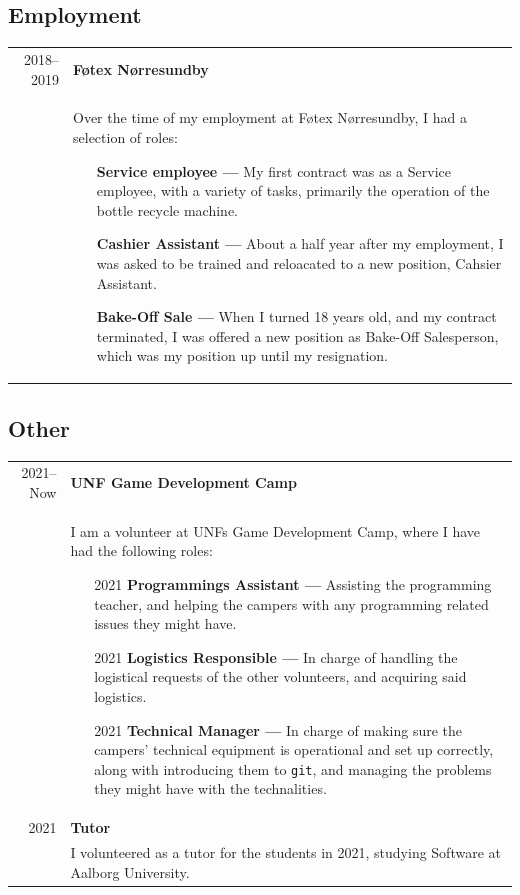 \documentclass{article}
\begin{document}
    \subsection*{Employment}
    \begin{tabular}{p{}|p{}}
    \multicolumn{1}{r|}{2018--2019} & \textbf{Føtex Nørresundby}\\
    &   Over the time of my employment at Føtex Nørresundby, I had a selection of roles:
        \begin{itemize}\setlength\itemsep{0em}
            \item[] \textbf{Service employee --- } My first contract was as a Service employee,
                with a variety of tasks, primarily the operation of the bottle recycle machine.
            \item[] \textbf{Cashier Assistant --- } About a half year after my employment,
                I was asked to be trained and reloacated to a new position, Cahsier Assistant.
            \item[] \textbf{Bake-Off Sale --- } When I turned 18 years old, and my contract
                terminated, I was offered a new position as Bake-Off Salesperson, which was my
                position up until my resignation.

        \end{itemize}
    \end{tabular}

    \subsection*{Other}
    \begin{tabular}{p{}|p{}}
        \multicolumn{1}{r|}{2021--Now} & \textbf{UNF Game Development Camp}\\
    &   I am a volunteer at UNFs Game Development Camp, where I have had the following roles:
        \begin{itemize}\setlength\itemsep{0em}
            \item[2021] \textbf{Programmings Assistant ---} Assisting the programming teacher, and
                helping the campers with any programming related issues they might have.
            \item[2021] \textbf{Logistics Responsible ---} In charge of handling the logistical
                requests of the other volunteers, and acquiring said logistics.
            \item[2021] \textbf{Technical Manager ---} In charge of making sure the campers'
                technical equipment is operational and set up correctly,
                along with introducing them to \verb|git|, and managing
                the problems they might have with the technalities.
        \end{itemize}
        \\
    \multicolumn{1}{r|}{2021} & \textbf{Tutor}\\
    &   I volunteered as a tutor for the students in 2021, studying Software at Aalborg University. 
    \end{tabular}
\end{document}
